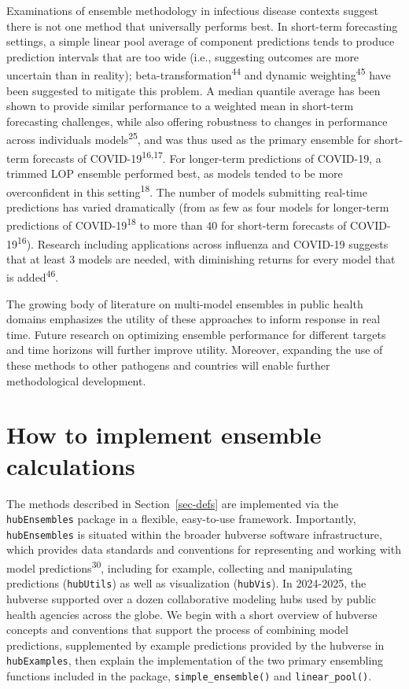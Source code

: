\documentclass[
  letterpaper,
  DIV=11,
  numbers=noendperiod]{scrartcl}
\begin{document}
Examinations of ensemble methodology in infectious disease contexts
suggest there is not one method that universally performs best. In
short-term forecasting settings, a simple linear pool average of
component predictions tends to produce prediction intervals that are too
wide (i.e., suggesting outcomes are more uncertain than in reality);
beta-transformation\textsuperscript{44} and dynamic
weighting\textsuperscript{45} have been suggested to mitigate this
problem. A median quantile average has been shown to provide similar
performance to a weighted mean in short-term forecasting challenges,
while also offering robustness to changes in performance across
individuals models\textsuperscript{25}, and was thus used as the primary
ensemble for short-term forecasts of COVID-19\textsuperscript{16,17}.
For longer-term predictions of COVID-19, a trimmed LOP ensemble
performed best, as models tended to be more overconfident in this
setting\textsuperscript{18}. The number of models submitting real-time
predictions has varied dramatically (from as few as four models for
longer-term predictions of COVID-19\textsuperscript{18} to more than 40
for short-term forecasts of COVID-19\textsuperscript{16}). Research
including applications across influenza and COVID-19 suggests that at
least 3 models are needed, with diminishing returns for every model that
is added\textsuperscript{46}.

The growing body of literature on multi-model ensembles in public health
domains emphasizes the utility of these approaches to inform response in
real time. Future research on optimizing ensemble performance for
different targets and time horizons will further improve utility.
Moreover, expanding the use of these methods to other pathogens and
countries will enable further methodological development.

\section{How to implement ensemble
calculations}\label{sec-implementation}

The methods described in Section~\ref{sec-defs} are implemented via the
\texttt{hubEnsembles} package in a flexible, easy-to-use framework.
Importantly, \texttt{hubEnsembles} is situated within the broader
hubverse software infrastructure, which provides data standards and
conventions for representing and working with model
predictions\textsuperscript{30}, including for example, collecting and
manipulating predictions (\texttt{hubUtils}) as well as visualization
(\texttt{hubVis}). In 2024-2025, the hubverse supported over a dozen
collaborative modeling hubs used by public health agencies across the
globe. We begin with a short overview of hubverse concepts and
conventions that support the process of combining model predictions,
supplemented by example predictions provided by the hubverse in
\texttt{hubExamples}, then explain the implementation of the two primary
ensembling functions included in the package,
\texttt{simple\_ensemble()} and \texttt{linear\_pool()}.
\end{document}
